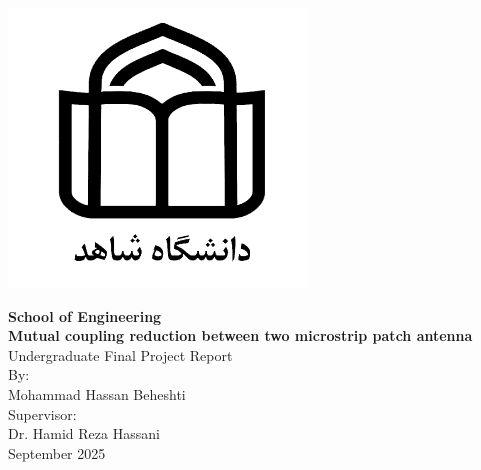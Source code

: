 \newpage
\thispagestyle{empty}
\vspace*{-28mm}

\centerline{\includegraphics[scale=0.5]{./Images/general/logo_en.png}}
\begin{latin}
\begin{center}
\large
\vspace{-1mm}
\textbf{School of Engineering}
\\[3cm]
\textbf{Mutual coupling reduction between two microstrip patch antenna}
\\[1.5cm]
Undergraduate Final Project Report
\\[4cm]
By: 
\\[0.5cm]
Mohammad Hassan Beheshti
\\[1cm]
Supervisor:
\\[0.5cm]
Dr. Hamid Reza Hassani
\\[2cm]
September 2025

\end{center}
\end{latin}